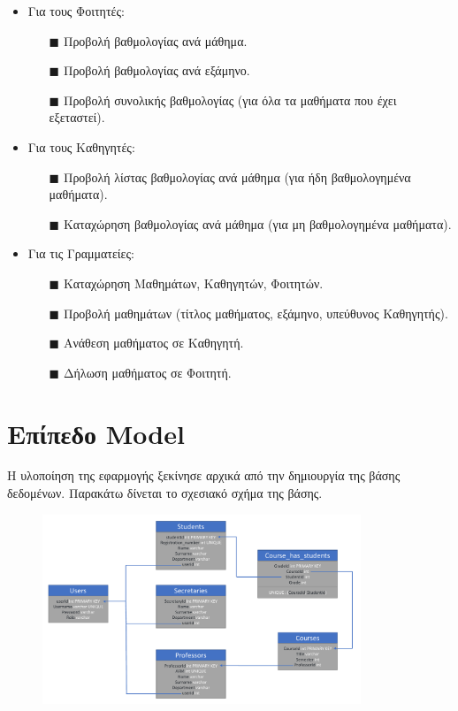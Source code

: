 \documentclass[12pt]{article}
\begin{document}
	\begin{itemize}
		
		\item Για τους Φοιτητές:
		\begin{itemize}
			\item[$\blacksquare$] Προβολή βαθμολογίας ανά μάθημα.
			\item[$\blacksquare$] Προβολή βαθμολογίας ανά εξάμηνο.
			\item[$\blacksquare$] Προβολή συνολικής βαθμολογίας (για όλα τα μαθήματα που έχει εξεταστεί).
		\end{itemize}
	
		\item Για τους Καθηγητές:
		\begin{itemize}
			\item[$\blacksquare$] Προβολή λίστας βαθμολογίας ανά μάθημα (για ήδη βαθμολογημένα μαθήματα).
			\item[$\blacksquare$] Καταχώρηση βαθμολογίας ανά μάθημα (για μη βαθμολογημένα μαθήματα).
		\end{itemize}
	
		\item Για τις Γραμματείες:
		\begin{itemize}
			\item[$\blacksquare$] Καταχώρηση Μαθημάτων, Καθηγητών, Φοιτητών.
			\item[$\blacksquare$] Προβολή μαθημάτων (τίτλος μαθήματος, εξάμηνο, υπεύθυνος Καθηγητής).
			\item[$\blacksquare$] Ανάθεση μαθήματος σε Καθηγητή.
			\item[$\blacksquare$] Δήλωση μαθήματος σε Φοιτητή.
		\end{itemize}
	
	\end{itemize}
	
	\newpage
	\section{Επίπεδο Model}
	Η υλοποίηση της εφαρμογής ξεκίνησε αρχικά από την δημιουργία της βάσης δεδομένων. Παρακάτω δίνεται το σχεσιακό σχήμα της βάσης.
	
	\begin{figure}[H]
		\centering
		\includegraphics[width=0.85\textwidth]{table.pdf}
		\caption{}
		\label{fig:bex}
	\end{figure}
	
\end{document}
